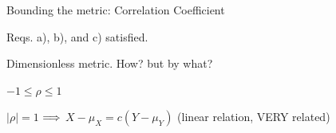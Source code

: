 \documentclass[fleqn,aspectratio=169]{beamer}
\begin{document}
\begin{frame}{Bounding the metric: Correlation Coefficient}

\plitemsep 0.05in

\bci 

\item<1-> Reqs. a), b), and c) satisfied. 

\bce
\item<2->[d)] 
\ece

\item<3-> Dimensionless metric. How?  but by what?

\item<6-> $-1 \le \rho \le 1$

\item<7-> $|\rho|=1$ $\Longrightarrow$ $X-\mu_X = c(Y-\mu_Y)$ (linear relation, VERY related)

\eci

\end{frame}
\end{document}
